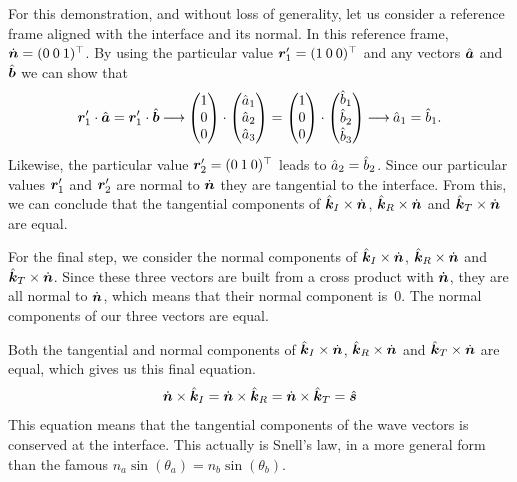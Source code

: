 For this demonstration, and without loss of generality, let us consider a reference frame aligned with the interface and its normal.
In this reference frame, $\dot{\bm{n}}=(0 \: 0 \: 1)^\top$.
By using the particular value $\bm{r}_1'=(1 \: 0 \: 0)^\top$ and any vectors $\hat{\bm{a}}$ and $\hat{\bm{b}}$ we can show that
\begin{equation}
    \bm{r}_1' \cdot \hat{\bm{a}} = \bm{r}_1' \cdot \hat{\bm{b}}
    \mathbin{\longrightarrow}
    \begin{pmatrix}
        1 \\ 0 \\ 0
    \end{pmatrix}
    \cdot
    \begin{pmatrix}
        \hat{a}_1 \\ \hat{a}_2 \\ \hat{a}_3
    \end{pmatrix}
    =
    \begin{pmatrix}
        1 \\ 0 \\ 0
    \end{pmatrix}
    \cdot
    \begin{pmatrix}
        \hat{b}_1 \\ \hat{b}_2 \\ \hat{b}_3
    \end{pmatrix}
    \mathbin{\longrightarrow}
    \hat{a}_1 = \hat{b}_1
    \text{.}
\end{equation}
Likewise, the particular value $\bm{r}_2' = (0 \: 1 \: 0)^\top$ leads to $\hat{a}_2 = \hat{b}_2$.
Since our particular values $\bm{r}_1'$ and $\bm{r}_2'$ are normal to $\dot{\bm{n}}$ they are tangential to the interface.
From this, we can conclude that the tangential components of $\hat{\bm{k}}_I \times \dot{\bm{n}}$, $\hat{\bm{k}}_R \times \dot{\bm{n}}$ and $\hat{\bm{k}}_T \times \dot{\bm{n}}$ are equal.

For the final step, we consider the normal components of $\hat{\bm{k}}_I \times \dot{\bm{n}}$, $\hat{\bm{k}}_R \times \dot{\bm{n}}$ and $\hat{\bm{k}}_T \times \dot{\bm{n}}$.
Since these three vectors are built from a cross product with $\dot{\bm{n}}$, they are all normal to $\dot{\bm{n}}$, which means that their normal component is~$0$.
The normal components of our three vectors are equal.

Both the tangential and normal components of $\hat{\bm{k}}_I \times \dot{\bm{n}}$, $\hat{\bm{k}}_R \times \dot{\bm{n}}$ and $\hat{\bm{k}}_T \times \dot{\bm{n}}$ are equal, which gives us this final equation.
\begin{equation}
    \dot{\bm{n}} \times \hat{\bm{k}}_I =
    \dot{\bm{n}} \times \hat{\bm{k}}_R =
    \dot{\bm{n}} \times \hat{\bm{k}}_T =
    \hat{\bm{s}}
    \label{eq:plane_of_incidence_normal}
\end{equation}
This equation means that the tangential components of the wave vectors is conserved at the interface.
This actually is Snell's law, in a more general form than the famous $n_a \sin(\theta_a) = n_b \sin(\theta_b)$.

